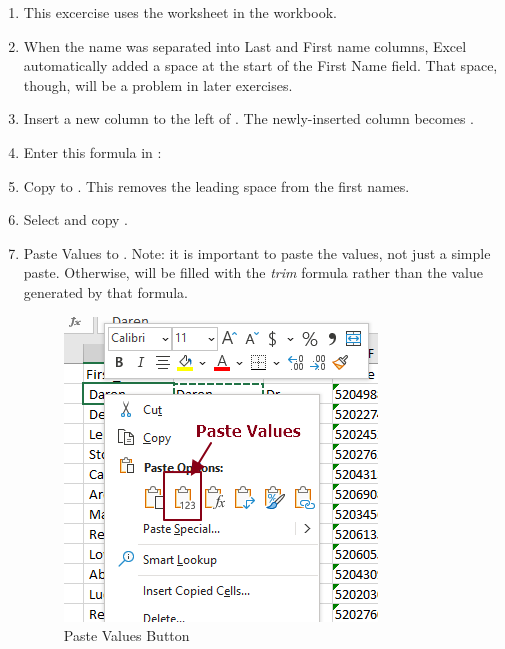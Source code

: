 \begin{enumerate}
	\item This excercise uses the  worksheet in the  workbook.
	\item When the name was separated into Last and First name columns, Excel automatically added a space at the start of the First Name field. That space, though, will be a problem in later exercises. 
	\item Insert a new column to the left of . The newly-inserted column becomes .
	\item Enter this formula in : 
	\item Copy  to . This removes the leading space from the first names.
	\item Select and copy .
	\item Paste Values to . Note: it is important to paste the values, not just a simple paste. Otherwise,  will be filled with the \textit{trim} formula rather than the value generated by that formula.
	
	\begin{figure}[H]
		\centering
		\includegraphics[width=\maxwidth{.95\linewidth}]{gfx/ch09_fig34}
		\caption{Paste Values Button}
		\label{09:fig34}
	\end{figure}
	

\end{enumerate}
